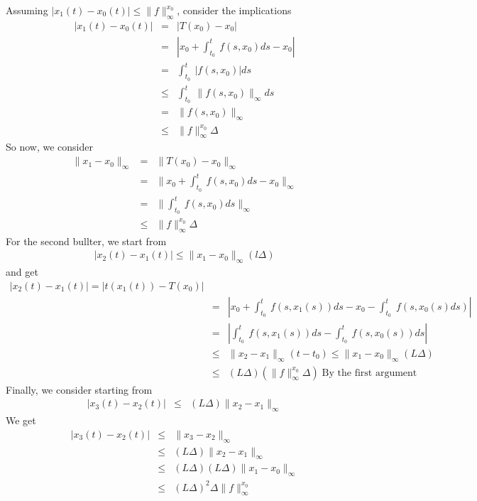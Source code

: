 \documentclass[11pt]{SelfArxOneColBMN}
\begin{document}
\begin{solution}
Assuming $|x_1(t) - x_0(t)| \leq \|f\|_\infty^{x_0}$, consider the implications
\begin{eqnarray*}
  |x_1(t) - x_0(t)| &=& |T(x_0) - x_0|\\
  &=& |x_0 + \int_{t_0}^t\:f(s,x_0)ds - x_0|\\
  &=& \int_{t_0}^t\:|f(s,x_0)|ds\\
  &\leq& \int_{t_0}^t\:\|f(s,x_0)\|_{\infty}ds\\
  &=& \|f(s,x_0)\|_{\infty}\\
  &\leq& \|f\|_{\infty}^{x_0} \Delta
\end{eqnarray*}
So now, we consider
\begin{eqnarray*}
  \|x_1 - x_0\|_{\infty} &=& \|T(x_0) - x_0\|_{\infty}\\
  &=& \|x_0 + \int_{t_0}^t\:f(s,x_0)ds - x_0\|_{\infty}\\
  &=& \|\int_{t_0}^t\:f(s,x_0)ds\|_{\infty}\\
  &\leq& \|f\|_{\infty}^{x_0} \Delta
\end{eqnarray*}
For the second bullter, we start from
\begin{eqnarray*}
  |x_2(t) - x_1(t)| \leq \|x_1 - x_0\|_\infty(l\Delta)
\end{eqnarray*}
and get
\begin{eqnarray*}
  |x_2(t) - x_1(t)| = |t(x_1(t)) - T(x_0)|\\
  &=& |x_0 + \int_{t_0}^t\:f(s,x_1(s))ds - x_0 - \int_{t_0}^t\;f(s,x_0(s)ds)|\\
  &=& |\int_{t_0}^t\:f(s,x_1(s))ds - \int_{t_0}^t\:f(s,x_0(s))ds |\\
  &\leq& \|x_2 - x_1\|_\infty(t - t_0) \leq \|x_1 - x_0\|_\infty(L\Delta)\\
  &\leq& (L\Delta)(\|f\|_\infty^{x_0}\Delta) \; \text{By the first argument}
\end{eqnarray*}
Finally, we consider starting from
\begin{eqnarray*}
  |x_3(t) - x_2(t)| &\leq& (L\Delta)\|x_2 - x_1\|_\infty
\end{eqnarray*}
We get
\begin{eqnarray*}
  |x_3(t) - x_2(t)| &\leq& \|x_3 - x_2\|_\infty\\
  &\leq& (L\Delta)\|x_2 - x_1\|_\infty\\
  &\leq& (L\Delta)(L\Delta)\|x_1 - x_0\|_\infty\\
  &\leq& (L\Delta)^2 \Delta \|f\|_\infty^{x_0}
\end{eqnarray*}
\end{solution}
\end{document}
